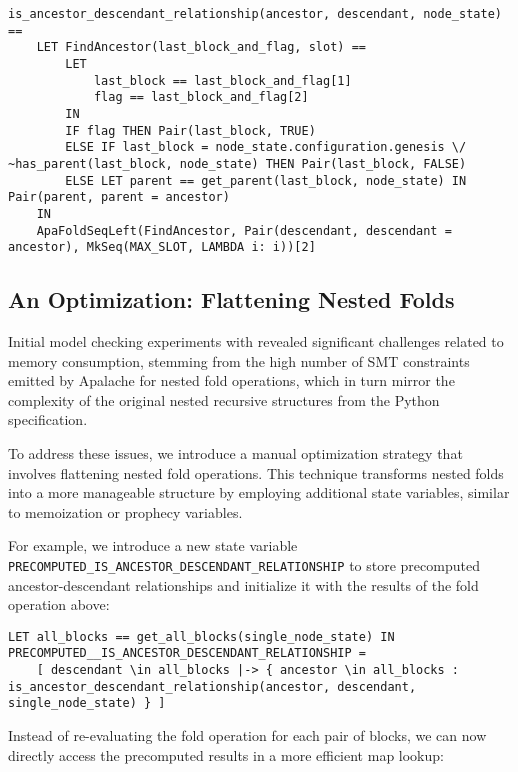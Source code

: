 \begin{lstlisting}[language=tla]
is_ancestor_descendant_relationship(ancestor, descendant, node_state) ==
    LET FindAncestor(last_block_and_flag, slot) ==
        LET
            last_block == last_block_and_flag[1]
            flag == last_block_and_flag[2]
        IN
        IF flag THEN Pair(last_block, TRUE)
        ELSE IF last_block = node_state.configuration.genesis \/ ~has_parent(last_block, node_state) THEN Pair(last_block, FALSE)
        ELSE LET parent == get_parent(last_block, node_state) IN Pair(parent, parent = ancestor)
    IN
    ApaFoldSeqLeft(FindAncestor, Pair(descendant, descendant = ancestor), MkSeq(MAX_SLOT, LAMBDA i: i))[2]
\end{lstlisting}

\subsection{An Optimization: Flattening Nested Folds}

Initial model checking experiments with \SpecTwo{} revealed significant
challenges related to memory consumption, stemming from the high number of SMT
constraints emitted by Apalache for nested fold operations, which in turn mirror
the complexity of the original nested recursive structures from the Python
specification.

To address these issues, we introduce a manual optimization strategy that
involves flattening nested fold operations. This technique transforms nested
folds into a more manageable structure by employing additional \tlap{} state
variables, similar to memoization or prophecy variables.

For example, we introduce a new \tlap{} state variable
\texttt{PRECOMPUTED\_IS\_ANCESTOR\_DESCENDANT\_RELATIONSHIP} to store
precomputed ancestor-descendant relationships and initialize it with the results
of the fold operation above:

\begin{lstlisting}[language=tla]
LET all_blocks == get_all_blocks(single_node_state) IN
PRECOMPUTED__IS_ANCESTOR_DESCENDANT_RELATIONSHIP =
    [ descendant \in all_blocks |-> { ancestor \in all_blocks : is_ancestor_descendant_relationship(ancestor, descendant, single_node_state) } ]
\end{lstlisting}

Instead of re-evaluating the fold operation for each pair of blocks, we can now
directly access the precomputed results in a more efficient map lookup:

